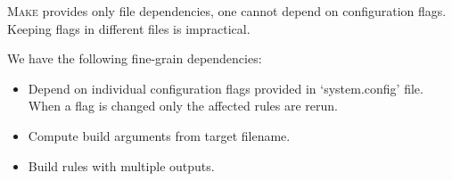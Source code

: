 \textsc{Make} provides only file dependencies, one cannot depend on
configuration flags. Keeping flags in different files is impractical.

We have the following fine-grain dependencies:
\begin{itemize}
  \item Depend on individual configuration flags provided in `system.config'
  file. When a flag is changed only the affected rules are rerun.
  \item Compute build arguments from target filename.
  \item Build rules with multiple outputs.
\end{itemize}
